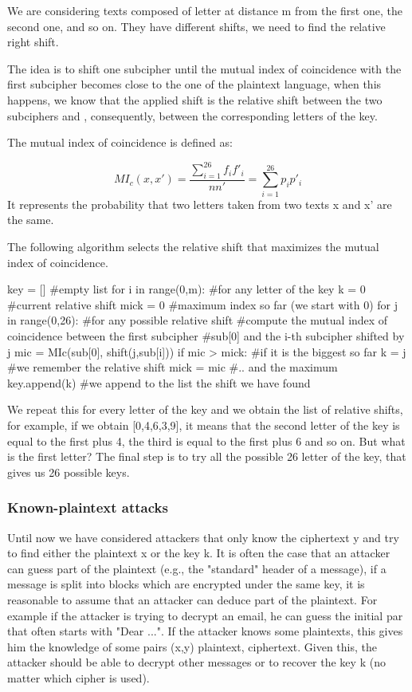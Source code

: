 \documentclass[a4paper, 12pt]{report}
\begin{document}
We are considering texts composed of letter at distance m from the first one, the second one, and so on. They have different shifts, we need to find the relative right shift.

The idea is to shift one subcipher until the mutual index of coincidence with the first subcipher becomes close to the one of the plaintext language, when this happens, we know that the applied shift is the relative shift between the two subciphers and , consequently, between the corresponding letters of the key.

The mutual index of coincidence is defined as:

\setcounter{equation}{0}
\begin{equation}
MI_c(x,x') = \frac{\sum_{i=1}^{26}f_if'_i}{nn'} = \sum_{i=1}^{26} p_ip'_i
\end{equation}
It represents the probability that two letters taken from two texts x and x' are the same.

The following algorithm selects the relative shift that maximizes the mutual index of coincidence.
\begin{python}
	key = [] #empty list
	for i in range(0,m): #for any letter of the key
		k = 0 #current relative shift
		mick = 0 #maximum index so far (we start with 0)
		for j in range(0,26): #for any possible relative shift
			#compute the mutual index of coincidence between the first subcipher
			#sub[0] and the i-th subcipher shifted by j
			mic = MIc(sub[0], shift(j,sub[i]))
			if mic > mick: #if it is the biggest so far
				k = j 		#we remember the relative shift
				mick = mic 	#.. and the maximum
		key.append(k) 		#we append to the list the shift we have found
\end{python}

We repeat this for every letter of the key and we obtain the list of relative shifts, for example, if we obtain [0,4,6,3,9], it means that the second letter of the key is equal to the first plus 4, the third is equal to the first plus 6 and so on. But what is the first letter? The final step is to try all the possible 26 letter of the key, that gives us 26 possible keys.

\subsubsection{Known-plaintext attacks}
Until now we have considered attackers that only know the ciphertext y and try to find either the plaintext x or the key k. It is often the case that an attacker can guess part of the plaintext (e.g., the "standard" header of a message), if a message is split into blocks which are encrypted under the same key, it is reasonable to assume that an attacker can deduce part of the plaintext. For example if the attacker is trying to decrypt an email, he can guess the initial par that often starts with "Dear ...".
If the attacker knows some plaintexts, this gives him the knowledge of some pairs (x,y) plaintext, ciphertext. Given this, the attacker should be able to decrypt other messages or to recover the key k (no matter which cipher is used).
\end{document}
